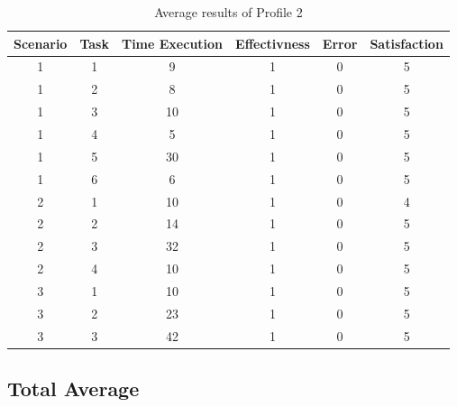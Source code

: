 \begin{table}[H]
  \begin{center}
    \begin{tabular}{||c|c|c|c|c|c||} %
      \textbf{Scenario} & \textbf{Task} & \textbf{Time Execution} & \textbf{Effectivness} & \textbf{Error} & \textbf{Satisfaction}\\
      
      \hline
        1 & 1 & 9 & 1 & 0 & 5\\
        1 & 2 & 8 & 1 & 0 & 5\\
        1 & 3 & 10 & 1 & 0 & 5\\
        1 & 4 & 5 & 1 & 0 & 5\\
        1 & 5 & 30 & 1 & 0 & 5\\
        1 & 6 & 6 & 1 & 0 & 5\\
        \hline
        2 & 1 & 10 & 1 & 0 & 4\\
        2 & 2 & 14 & 1 & 0 & 5\\
        2 & 3 & 32 & 1 & 0 & 5\\
        2 & 4 & 10 & 1 & 0 & 5\\
        \hline
        3 & 1 & 10 & 1 & 0 & 5\\
        3 & 2 & 23 & 1 & 0 & 5\\
        3 & 3 & 42 & 1 & 0 & 5\\
        \hline

    \end{tabular}
  \end{center}
  \caption{Average results of Profile 2}
\end{table}

\subsection{Total Average}
\begin{figure}[H]
  \centering
\end{figure}


